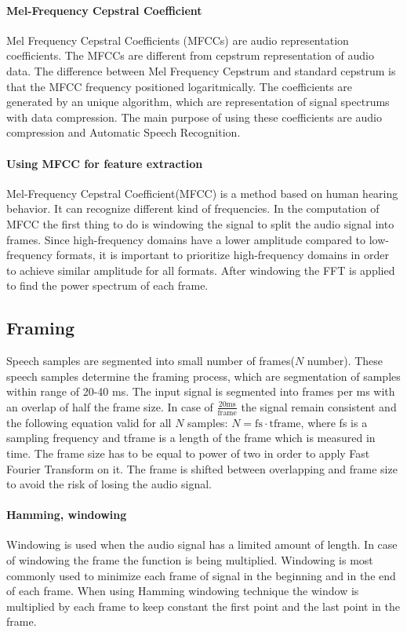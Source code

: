 \documentclass[english,12pt,oneside,a4paper]{article}
\begin{document}
		\paragraph{Mel-Frequency Cepstral Coefficient}
		Mel Frequency Cepstral Coefficients (MFCCs) are audio representation coefficients. The MFCCs are different from cepstrum representation of audio data. The difference between Mel Frequency Cepstrum and standard cepstrum is that the MFCC frequency positioned logaritmically. The coefficients are generated by an unique algorithm, which are representation of signal spectrums with data compression. The main purpose of using these coefficients are audio compression and Automatic Speech Recognition.
		\paragraph{Using MFCC for feature extraction}
		Mel-Frequency Cepstral Coefficient(MFCC) is a method based on human hearing behavior. It can recognize different kind of frequencies. In the computation of MFCC the first thing to do is windowing the signal to split the audio signal into frames. Since high-frequency domains have a lower amplitude compared to low-frequency formats, it is important to prioritize high-frequency domains in order to achieve similar amplitude for all formats. After windowing the FFT is applied to find the power spectrum of each frame. 
		\subsection{Framing}
		Speech samples are segmented into small number of frames($N$ number). These speech samples determine the framing process, which are segmentation of samples within  range of  20-40 ms. The input signal is segmented into frames per ms with an overlap of half the frame size. In case of $\frac{20\text{ms}}{\text{frame}}$ the signal remain consistent and the following equation valid for all $N$ samples: $N = \text{fs}\cdot\text{tframe}$, where fs is a sampling frequency and tframe is a length of the frame which is measured in time. The frame size has to be equal to power of two in order to apply Fast Fourier Transform on it. The frame is shifted between overlapping and frame size to avoid the risk of losing the audio signal.
		\paragraph{Hamming, windowing}
		Windowing is used when the audio signal has a limited amount of length. In case of windowing the frame the function is being multiplied. Windowing is most commonly used to minimize each frame of signal in the beginning and in the end of each frame. When using Hamming windowing technique the window is multiplied by each frame to keep constant the first point and the last point in the frame.
\end{document}
